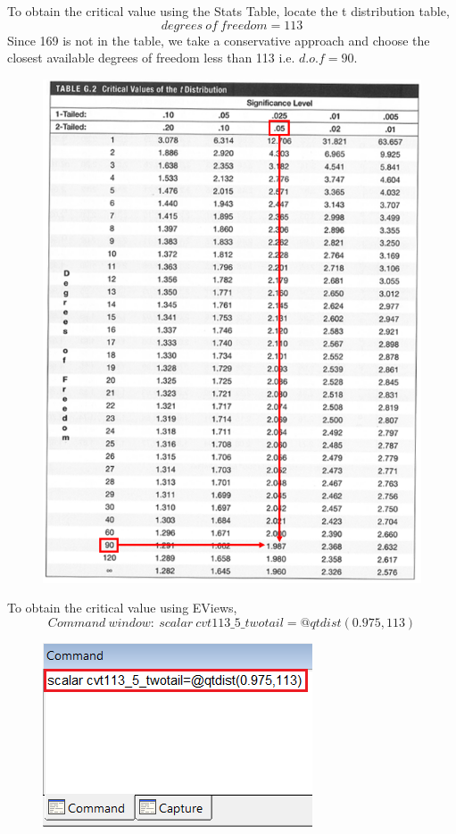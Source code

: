 \documentclass[12pt]{report}
\begin{document}
\noindent To obtain the critical value using the Stats Table, locate the t distribution table,
$$degrees\ of\ freedom = 113$$
\noindent Since 169 is not in the table, we take a conservative approach and choose the closest available degrees of freedom less than 113 i.e. $d.o.f=90$. 
\begin{figure}[H]
	\centering
	\includegraphics{q1_11}
\end{figure}
\vspace{-\baselineskip}
\noindent To obtain the critical value using EViews,
$$Command\ window:\ scalar\ cvt113\_5\_twotail=@qtdist(0.975,113)$$
\begin{figure}[H]
	\centering
	\includegraphics{q1_12}
\end{figure}
\end{document}
